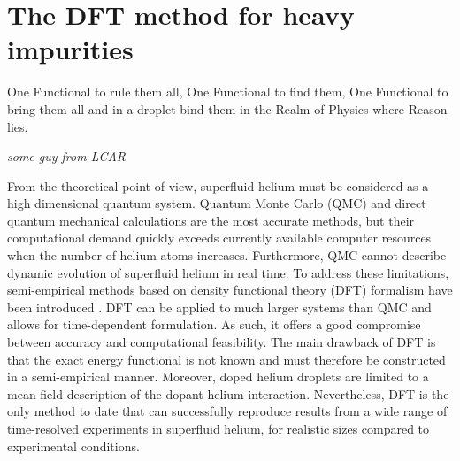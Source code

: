 \chapter{The DFT method for heavy impurities}\label{sec:dft-method}
	\epigraph{One Functional to rule them all,
				One Functional to find them,
				One Functional to bring them all
				and in a droplet bind them
				in the Realm of Physics where Reason lies.}{\textit{some guy from LCAR}}

	From the theoretical point of view, superfluid helium must be considered as a high dimensional quantum system. Quantum Monte Carlo (QMC) \cite{Kro02} and direct quantum mechanical \cite{deL06,deL10,Agu13} calculations are the most accurate methods, but their computational demand quickly exceeds currently available computer resources when the number of helium atoms increases. Furthermore, QMC cannot describe dynamic evolution of superfluid helium in real time. To address these limitations, semi-empirical methods based on  density functional theory (DFT) formalism have been introduced \cite{Str87a,Str87b,Dal95}. DFT can be applied to much larger systems than QMC and allows for time-dependent formulation. As such, it offers a good compromise between accuracy and computational feasibility. The main drawback of DFT is that the exact energy functional is not known and must therefore be constructed in a semi-empirical manner. Moreover, doped helium droplets are limited to a mean-field description of the dopant-helium interaction. Nevertheless, DFT is the only method to date that can successfully reproduce results from a wide range of time-resolved experiments in superfluid helium, for realistic sizes compared to experimental conditions.\\
	
